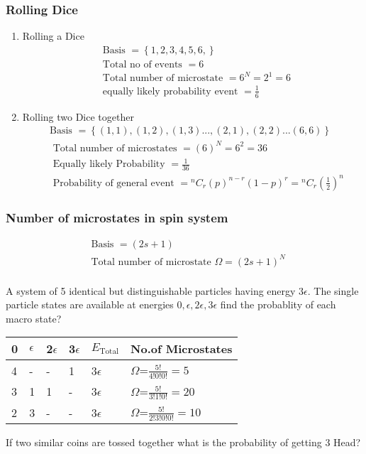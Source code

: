 \subsubsection{ Rolling Dice}
\begin{enumerate}
	\item Rolling a Dice
	\begin{align*}
	&\text{Basis }=\left\lbrace 1,2,3,4,5,6,\right\rbrace \\
	&\text{Total no of events }=6\\
	&\text{Total number of microstate }=6^N=2^1=6 \\
	&\text{equally likely probability event }=\frac{1}{6} 
	\end{align*}
	\item {Rolling two Dice together}
	\begin{align*}
	&\text{Basis }=\left\lbrace (1,1), (1,2),(1,3)..., (2,1),(2,2)...(6,6)\right\rbrace \\
	&\text{ Total number of microstates }=(6)^{N}=6^2=36\\
	&\text{ Equally likely Probability }=\frac{1}{36} \\
	&\text { Probability of general event } 
	={ }^{n} C_{r}(p)^{n-r}(1-p)^{r} =
	{ }^{n} C_{r}\left(\frac{1}{2}\right)^{n}
	\end{align*}
\end{enumerate}
\subsubsection{ Number of microstates in spin system}
\begin{align*}
&\text{Basis }=(2s+1) \\
&\text{Total number of microstate }\Omega=(2 s+1)^{N} \\
\end{align*}


\begin{exercise}
	A system of 5 identical but distinguishable particles having energy $3\epsilon$. The single particle states are available at energies $0,\epsilon,2\epsilon,3\epsilon$ find the probablity of each macro state?
\end{exercise}
\renewcommand*{\arraystretch}{2}
\begin{tabular}{|p{1cm}|p{1cm}|p{1cm}|p{1cm}|p{1cm}|p{3cm}|}
	\hline
	0&$\epsilon$&2$\epsilon$&3$\epsilon$&$E_{\text{Total}}$&No.of Microstates\\\hline
	4&-&-&1&3$\epsilon$&$\Omega$=$\frac{5!}{4!0!0!}=5$\\\hline
	3&1&1&-&3$\epsilon$&$\Omega$=$\frac{5!}{3!1!0!}=20$\\\hline
	2&3&-&-&3$\epsilon$&$\Omega$=$\frac{5!}{2!3!0!0!}=10$\\\hline
\end{tabular}
\begin{exercise}
	If two similar coins are tossed together what is the probability of getting 3 Head?
\end{exercise}

